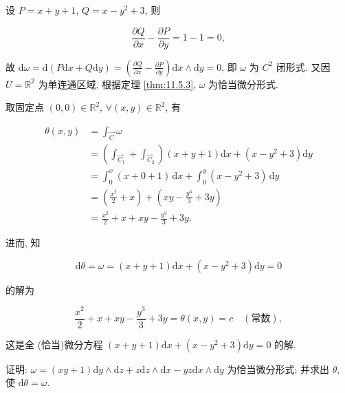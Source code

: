 \begin{solution}

设 $P=x+y+1$, $Q=x-y^{2}+3$, 则

\[
\frac{\partial Q}{\partial x}-\frac{\partial P}{\partial y}=1-1=0,
\]

故 $\mathrm{d}\omega=\mathrm{d}(P\mathrm{d}x+Q\mathrm{d}y)=\left(\frac{\partial Q}{\partial x}-\frac{\partial P}{\partial y}\right)\mathrm{d}x\wedge\mathrm{d}y=0$, 即 $\omega$ 为 $C^{2}$ 闭形式. 又因 $U=\mathbb{R}^{2}$ 为单连通区域, 根据定理 \ref{thm:11.5.3}, $\omega$ 为恰当微分形式.

取固定点 $(0,0)\in\mathbb{R}^{2}$, $\forall(x,y)\in\mathbb{R}^{2}$, 有

\[
\begin{aligned}
\theta(x,y)&=\int_{\overrightarrow{C}}\omega\\
&=\left(\int_{\overrightarrow{C}_{1}}+\int_{\overrightarrow{C}_{2}}\right)(x+y+1)\mathrm{d}x+(x-y^{2}+3)\mathrm{d}y\\
&=\int_{0}^{x}(x+0+1)\,\mathrm{d}x+\int_{0}^{y}(x-y^{2}+3)\,\mathrm{d}y\\
&=\left(\frac{x^{2}}{2}+x\right)+\left(xy-\frac{y^{3}}{3}+3y\right)\\
&=\frac{x^{2}}{2}+x+xy-\frac{y^{3}}{3}+3y.
\end{aligned}
\]

进而, 知

\[
\mathrm{d}\theta=\omega=(x+y+1)\mathrm{d}x+(x-y^{2}+3)\mathrm{d}y=0
\]

的解为

\[
\frac{x^{2}}{2}+x+xy-\frac{y^{3}}{3}+3y=\theta(x,y)=c\quad(\text{常数}),
\]

这是全 (恰当)微分方程 $(x+y+1)\mathrm{d}x+(x-y^{2}+3)\mathrm{d}y=0$ 的解.

\end{solution}

\begin{example}\label{ex:11.5.2}

证明: $\omega=(xy+1)\mathrm{d}y\wedge\mathrm{d}z+z\mathrm{d}z\wedge\mathrm{d}x-yz\mathrm{d}x\wedge\mathrm{d}y$ 为恰当微分形式; 并求出 $\theta$, 使 $\mathrm{d}\theta=\omega$.

\end{example}

